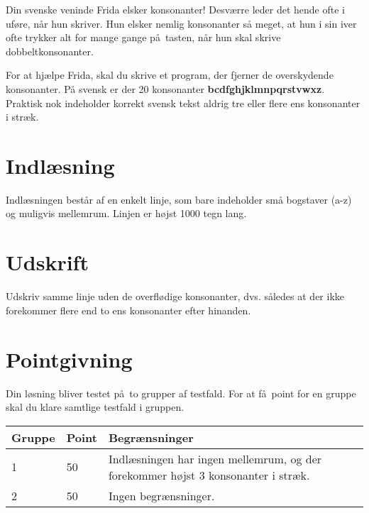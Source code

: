 Din svenske veninde Frida elsker konsonanter!
Desværre leder det hende ofte i uføre, når hun skriver.
Hun elsker nemlig konsonanter så meget, at hun i sin iver ofte trykker alt for mange gange på tasten, når hun skal skrive dobbeltkonsonanter.

For at hjælpe Frida, skal du skrive et program, der fjerner de overskydende konsonanter.
På svensk er der 20 konsonanter
\textbf{bcdfghjklmnpqrstvwxz}.
Praktisk nok indeholder korrekt svensk tekst aldrig tre eller flere ens konsonanter i stræk.

\section*{Indlæsning}
Indlæsningen består af en enkelt linje, som bare indeholder små bogstaver (a-z) og muligvis mellemrum. 
Linjen er højst 1000 tegn lang.

\section*{Udskrift}
Udskriv samme linje uden de overflødige konsonanter, dvs. således at der ikke forekommer flere end to ens konsonanter efter hinanden.

\section*{Pointgivning}

Din løsning bliver testet på to grupper af testfald.
For at få point for en gruppe skal du klare samtlige testfald i gruppen.

\noindent
\begin{tabular}{| l | l | l |}
\hline
Gruppe & Point & Begrænsninger \\ \hline
1     & 50          &  Indlæsningen har ingen mellemrum, og der forekommer højst 3 konsonanter i stræk.\\ \hline
2     & 50         &  Ingen begrænsninger. \\ \hline
\end{tabular}

